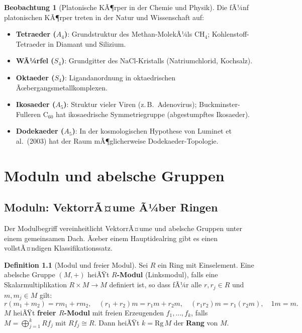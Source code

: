 ﻿\documentclass[a4paper,12pt]{report}
\theoremstyle{definition}
\newtheorem{definition}{Definition}
\newtheorem{beobachtung}{Beobachtung}
\begin{document}
\begin{beobachtung}[Platonische KÃ¶rper in der Chemie und Physik]
    Die fÃ¼nf platonischen KÃ¶rper treten in der Natur und Wissenschaft auf:
    \begin{itemize}
        \item[-] \textbf{Tetraeder ($A_4$)}: Grundstruktur des
              Methan-MolekÃ¼ls $\mathrm{CH}_4$; Kohlenstoff-Tetraeder
              in Diamant und Silizium.
        \item[-] \textbf{WÃ¼rfel ($S_4$)}: Grundgitter des $\mathrm{NaCl}$-Kristalls
              (Natriumchlorid, Kochsalz).
        \item[-] \textbf{Oktaeder ($S_4$)}: Ligandanordnung in
              oktaedrischen Ãœbergangsmetallkomplexen.
        \item[-] \textbf{Ikosaeder ($A_5$)}: Struktur vieler Viren
              (z.\,B.\ Adenovirus); Buckminster-Fulleren $\mathrm{C}_{60}$
              hat ikosaedrische Symmetriegruppe (abgestumpftes Ikosaeder).
        \item[-] \textbf{Dodekaeder ($A_5$)}: In der kosmologischen
              Hypothese von Luminet et al.\ (2003) hat der Raum mÃ¶glicherweise
              Dodekaeder-Topologie.
    \end{itemize}
\end{beobachtung}

\chapter{Moduln und abelsche Gruppen}

\section{Moduln: VektorrÃ¤ume Ã¼ber Ringen}

Der Modulbegriff vereinheitlicht VektorrÃ¤ume und abelsche Gruppen
unter einem gemeinsamen Dach. Ãœber einem Hauptidealring gibt es
einen vollstÃ¤ndigen Klassifikationssatz.

\begin{definition}[Modul und freier Modul]
    Sei $R$ ein Ring mit Einselement. Eine abelsche Gruppe $(M, +)$
    heiÃŸt \textbf{$R$-Modul} (Linksmodul), falls eine Skalarmultiplikation
    $R \times M \to M$ definiert ist, so dass fÃ¼r alle $r, r_j \in R$
    und $m, m_j \in M$ gilt:
    \[
        r(m_1 + m_2) = rm_1 + rm_2, \quad
        (r_1 + r_2)m = r_1 m + r_2 m, \quad
        (r_1 r_2)m = r_1(r_2 m), \quad
        1m = m.
    \]
    $M$ heiÃŸt \textbf{freier $R$-Modul} mit freien Erzeugenden
    $f_1, \dots, f_k$, falls $M = \bigoplus_{j=1}^k R f_j$ mit
    $Rf_j \cong R$. Dann heiÃŸt $k = \mathrm{Rg}\, M$ der \textbf{Rang}
    von $M$.
\end{definition}
\end{document}
